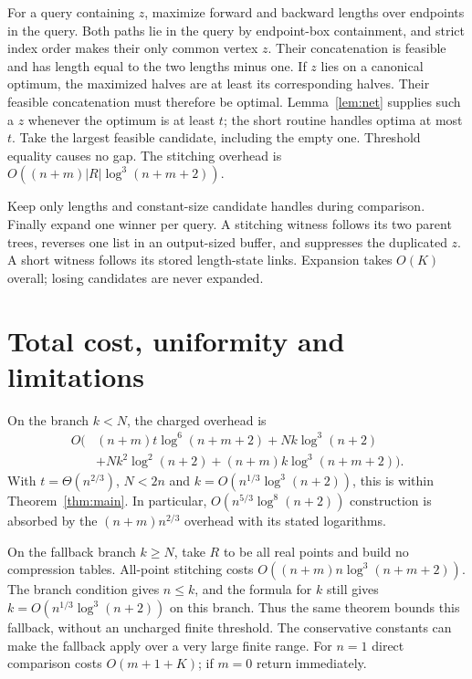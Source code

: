 \documentclass[acmsmall,11pt,nonacm,natbib=false]{acmart}
\begin{document}
For a query containing $z$, maximize forward and backward lengths over
endpoints in the query. Both paths lie in the query by endpoint-box
containment, and strict index order makes their only common vertex $z$.
Their concatenation is feasible and has length equal to the two lengths
minus one. If $z$ lies on a canonical optimum, the maximized halves are
at least its corresponding halves. Their feasible concatenation must
therefore be optimal. Lemma~\ref{lem:net} supplies such a $z$ whenever the
optimum is at least $t$; the short routine handles optima at most $t$.
Take the largest feasible candidate, including the empty one. Threshold
equality causes no gap. The stitching overhead is
$O((n+m)|R|\log^3(n+m+2))$.

Keep only lengths and constant-size candidate handles during comparison.
Finally expand one winner per query. A stitching witness follows its two
parent trees, reverses one list in an output-sized buffer, and suppresses
the duplicated $z$. A short witness follows its stored length-state links.
Expansion takes $O(K)$ overall; losing candidates are never expanded.

\section{Total cost, uniformity and limitations}\label{sec:cost}
On the branch $k<N$, the charged overhead is
\begin{equation}\label{eq:total}
 \begin{split}
 O\bigl(& (n+m)t\log^6(n+m+2)+Nk\log^3(n+2)\\
        &+Nk^2\log^2(n+2)+(n+m)k\log^3(n+m+2)\bigr).
 \end{split}
\end{equation}
With $t=\Theta(n^{2/3})$, $N<2n$ and
$k=O(n^{1/3}\log^3(n+2))$, this is within Theorem~\ref{thm:main}.
In particular, $O(n^{5/3}\log^8(n+2))$ construction is absorbed by the
$(n+m)n^{2/3}$ overhead with its stated logarithms.

On the fallback branch $k\geq N$, take $R$ to be all real points and build
no compression tables. All-point stitching costs
$O((n+m)n\log^3(n+m+2))$. The branch condition gives $n\leq k$, and
the formula for $k$ still gives $k=O(n^{1/3}\log^3(n+2))$ on this branch.
Thus the same theorem bounds this fallback, without an uncharged finite
threshold. The conservative constants can make the fallback apply over a
very large finite range. For $n=1$ direct comparison costs $O(m+1+K)$;
if $m=0$ return immediately.
\end{document}
